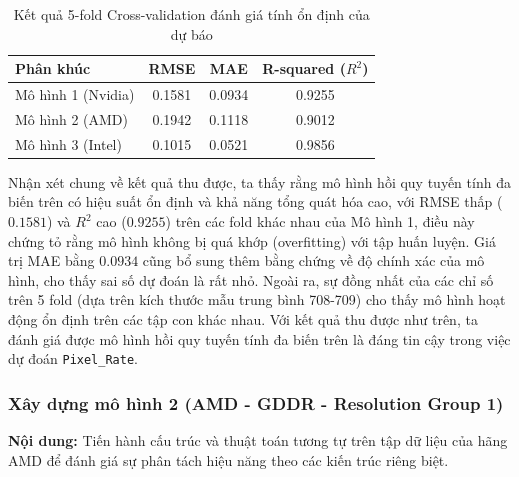 \begin{table}[H]
    \centering
    \caption{Kết quả 5-fold Cross-validation đánh giá tính ổn định của dự báo}
    \begin{tabular}{@{}lccc@{}}
        \toprule
        \textbf{Phân khúc} & \textbf{RMSE} & \textbf{MAE} & \textbf{R-squared ($R^2$)} \\ \midrule
        Mô hình 1 (Nvidia) & 0.1581 & 0.0934 & 0.9255 \\
        Mô hình 2 (AMD)    & 0.1942 & 0.1118 & 0.9012 \\
        Mô hình 3 (Intel)  & 0.1015 & 0.0521 & 0.9856 \\ \bottomrule
    \end{tabular}
    \label{tab:cv_results}
\end{table}

Nhận xét chung về kết quả thu được, ta thấy rằng mô hình hồi quy tuyến tính đa biến trên có hiệu suất ổn định và khả năng tổng quát hóa cao, với RMSE thấp ($0.1581$) và $R^2$ cao ($0.9255$) trên các fold khác nhau của Mô hình 1, điều này chứng tỏ rằng mô hình không bị quá khớp (overfitting) với tập huấn luyện. Giá trị MAE bằng $0.0934$ cũng bổ sung thêm bằng chứng về độ chính xác của mô hình, cho thấy sai số dự đoán là rất nhỏ. Ngoài ra, sự đồng nhất của các chỉ số trên 5 fold (dựa trên kích thước mẫu trung bình 708-709) cho thấy mô hình hoạt động ổn định trên các tập con khác nhau. Với kết quả thu được như trên, ta đánh giá được mô hình hồi quy tuyến tính đa biến trên là đáng tin cậy trong việc dự đoán \texttt{Pixel\_Rate}.

\subsubsection{Xây dựng mô hình 2 (AMD - GDDR - Resolution Group 1)}

\textbf{Nội dung:} Tiến hành cấu trúc và thuật toán tương tự trên tập dữ liệu của hãng AMD để đánh giá sự phân tách hiệu năng theo các kiến trúc riêng biệt.

